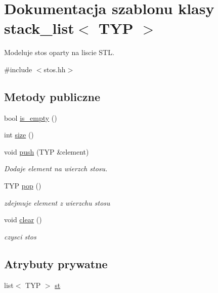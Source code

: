 \hypertarget{classstack__list}{\section{\-Dokumentacja szablonu klasy stack\-\_\-list$<$ \-T\-Y\-P $>$}
\label{classstack__list}
}


\-Modeluje stos oparty na liscie \-S\-T\-L.  




{\ttfamily \#include $<$stos.\-hh$>$}

\subsection*{\-Metody publiczne}
\begin{DoxyCompactItemize}
\item 
bool \hyperlink{classstack__list_a7f01744a7674ca41f55f2ea782360215}{is\-\_\-empty} ()
\item 
int \hyperlink{classstack__list_adcb1450ccbd547750e6a7939984a7c44}{size} ()
\item 
void \hyperlink{classstack__list_a7c8c94a164f180c87fa1d7a8be146a4c}{push} (\-T\-Y\-P \&element)
\begin{DoxyCompactList}\small\item\em \-Dodaje element na wierzch stosu. \end{DoxyCompactList}\item 
\-T\-Y\-P \hyperlink{classstack__list_aa77f6e528341ca41aefec405ebe6cd4f}{pop} ()
\begin{DoxyCompactList}\small\item\em zdejmuje element z wierzchu stosu \end{DoxyCompactList}\item 
void \hyperlink{classstack__list_afb284368d44ea1f2ab231c8f662deb5f}{clear} ()
\begin{DoxyCompactList}\small\item\em czysci stos \end{DoxyCompactList}\end{DoxyCompactItemize}
\subsection*{\-Atrybuty prywatne}
\begin{DoxyCompactItemize}
\item 
list$<$ \-T\-Y\-P $>$ \hyperlink{classstack__list_a3689c3e1f740bb83ec4471f0487a78a9}{st}
\end{DoxyCompactItemize}


